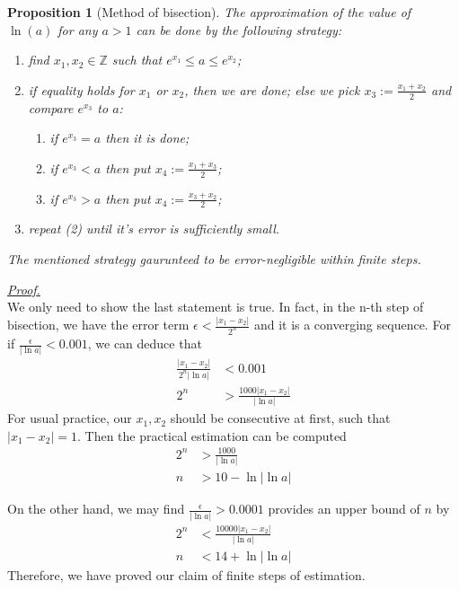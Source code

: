 \documentclass[12pt]{article}
\newtheorem*{proposition}{Proposition}
\renewenvironment{proof}[1][Proof]{\begin{snugshade*} \underline{\textit{{#1}.}}\\}{\hfill \qedsymbol \end{snugshade*}}
\begin{document}
    \begin{proposition}[Method of bisection]
        The approximation of the value of $\ln(a)$ for any $a>1$ can be done by the following strategy:\begin{enumerate}
            \item find $x_1,x_2\in\mathbb{Z}$ such that $e^{x_1}\leq a\leq e^{x_2}$;
            \item if equality holds for $x_1$ or $x_2$, then we are done; else we pick $x_3:=\frac{x_1+x_2}{2}$ and compare $e^{x_3}$ to $a$:\begin{enumerate}
                \item if $e^{x_3} = a$ then it is done;
                \item if $e^{x_3} < a$ then put $x_4:=\frac{x_1+x_3}{2}$;
                \item if $e^{x_3} > a$ then put $x_4:=\frac{x_3+x_2}{2}$;
            \end{enumerate}
            \item repeat (2) until it's error is sufficiently small.
        \end{enumerate}
        The mentioned strategy gaurunteed to be error-negligible within finite steps.
    \end{proposition}

    \begin{proof}
        We only need to show the last statement is true. In fact, in the n-th step of bisection, we have the error term $\epsilon<\frac{|x_1-x_2|}{2^n}$ and it is a converging sequence. For if $\frac{\epsilon}{|\ln{a}|}<0.001$, we can deduce that \begin{align*}
            \frac{|x_1-x_2|}{2^n |\ln{a}|}&<0.001\\
            2^n&>\frac{1000|x_1-x_2|}{|\ln{a}|}
        \end{align*}
        For usual practice, our $x_1,x_2$ should be consecutive at first, such that $|x_1-x_2|=1$. Then the practical estimation can be computed \begin{align*}
            2^n&>\frac{1000}{|\ln{a}|}\\
            n&>10-\ln{|\ln{a}|}
        \end{align*}
        
        On the other hand, we may find $\frac{\epsilon}{|\ln{a}|}>0.0001$ provides an upper bound of $n$ by \begin{align*}
            2^n&<\frac{10000|x_1-x_2|}{|\ln{a}|}\\
            n&<14+\ln{|\ln{a}|}
        \end{align*}
        Therefore, we have proved our claim of finite steps of estimation.
    \end{proof}
\end{document}
